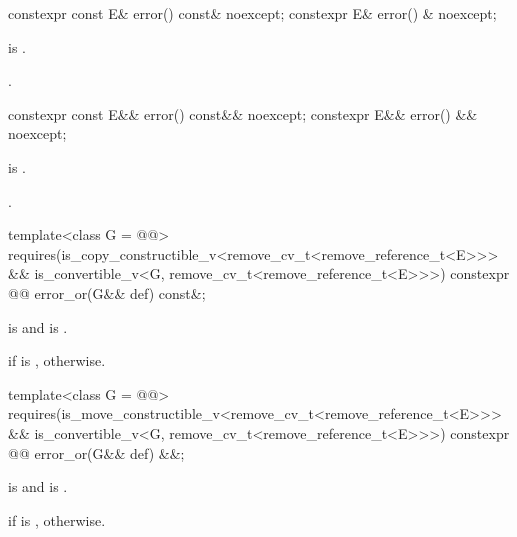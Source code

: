 %
\begin{itemdecl}
constexpr const E& error() const& noexcept;
constexpr E& error() & noexcept;
\end{itemdecl}

\begin{itemdescr}
\pnum
\hardexpects
{} is .

\pnum
\returns
{}.
\end{itemdescr}

%
\begin{itemdecl}
constexpr const E&& error() const&& noexcept;
constexpr E&& error() && noexcept;
\end{itemdecl}

\begin{itemdescr}
\pnum
\hardexpects
{} is .

\pnum
\returns
{}.
\end{itemdescr}

%
\begin{itemdecl}
template<class G = @@>
  requires(is_copy_constructible_v<remove_cv_t<remove_reference_t<E>>> &&
           is_convertible_v<G, remove_cv_t<remove_reference_t<E>>>)
constexpr @@ error_or(G&& def) const&;
\end{itemdecl}

\begin{itemdescr}
\pnum
\mandates
{} is  and  is .

\pnum
\returns
{} if  is ,  otherwise.
\end{itemdescr}

%
\begin{itemdecl}
template<class G = @@>
  requires(is_move_constructible_v<remove_cv_t<remove_reference_t<E>>> &&
           is_convertible_v<G, remove_cv_t<remove_reference_t<E>>>)
constexpr @@ error_or(G&& def) &&;
\end{itemdecl}

\begin{itemdescr}
\pnum
\mandates
{} is  and  is .

\pnum
\returns
{} if  is ,  otherwise.
\end{itemdescr}

